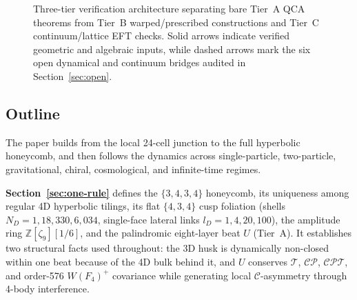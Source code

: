\begin{figure}[htbp]
\caption{Three-tier verification architecture separating bare Tier~A QCA theorems from Tier~B warped/prescribed
constructions and Tier~C continuum/lattice EFT checks. Solid arrows indicate verified geometric and algebraic inputs,
while dashed arrows mark the six open dynamical and continuum bridges audited in Section~\ref{sec:open}.}
\label{fig:tiers-map}
\end{figure}

\subsection*{Outline}

The paper builds from the local 24-cell junction to the full hyperbolic honeycomb, and then follows the dynamics across
single-particle, two-particle, gravitational, chiral, cosmological, and infinite-time regimes.

\textbf{Section~\ref{sec:one-rule}} defines the $\{3,4,3,4\}$ honeycomb, its uniqueness among regular 4D hyperbolic
tilings, its flat $\{4,3,4\}$ cusp foliation (shells $N_D = 1, 18, 330, 6{,}034$, single-face lateral links
$l_D = 1, 4, 20, 100$), the amplitude ring $\mathbb{Z}[\zeta_9][1/6]$, and the palindromic eight-layer beat $U$
(Tier~A). It establishes two structural facts used throughout: the 3D husk is dynamically non-closed within one beat
because of the 4D bulk behind it, and $U$ conserves $\mathcal{T}$, $\mathcal{CP}$, $\mathcal{CPT}$, and order-576
$W(F_4)^+$ covariance while generating local $\mathcal{C}$-asymmetry through 4-body interference.


